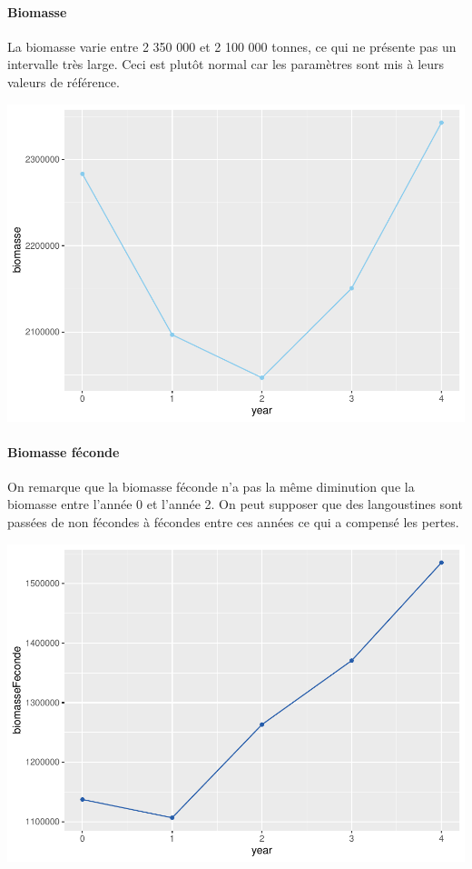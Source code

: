 \documentclass[
]{article}
\begin{document}
\hypertarget{biomasse}{%
\paragraph{Biomasse}\label{biomasse}}

La biomasse varie entre 2 350 000 et 2 100 000 tonnes, ce qui ne
présente pas un intervalle très large. Ceci est plutôt normal car les
paramètres sont mis à leurs valeurs de référence.

\includegraphics{rapport_files/figure-latex/ref-1.pdf}

\hypertarget{biomasse-fuxe9conde}{%
\paragraph{Biomasse féconde}\label{biomasse-fuxe9conde}}

On remarque que la biomasse féconde n'a pas la même diminution que la
biomasse entre l'année 0 et l'année 2. On peut supposer que des
langoustines sont passées de non fécondes à fécondes entre ces années ce
qui a compensé les pertes.

\includegraphics{rapport_files/figure-latex/refbf-1.pdf}
\end{document}
